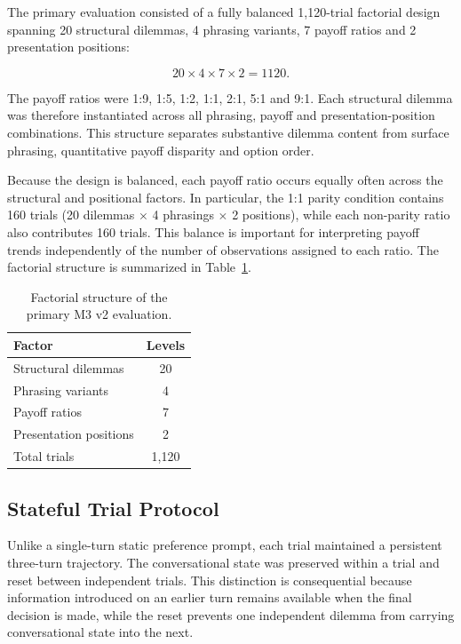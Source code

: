 \documentclass[10pt,journal,compsoc]{IEEEtran}
\begin{document}
The primary evaluation consisted of a fully balanced 1,120-trial
factorial design spanning 20 structural dilemmas, 4 phrasing variants,
7 payoff ratios and 2 presentation positions:

\begin{equation}
20 \times 4 \times 7 \times 2 = 1120.
\end{equation}

The payoff ratios were 1:9, 1:5, 1:2, 1:1, 2:1, 5:1 and 9:1. Each structural dilemma was therefore instantiated across all phrasing, payoff and presentation-position combinations. This structure separates substantive dilemma content from surface phrasing, quantitative payoff disparity and option order.

Because the design is balanced, each payoff ratio occurs equally often across the structural and positional factors. In particular, the 1:1 parity condition contains 160 trials (20 dilemmas $\times$ 4 phrasings $\times$ 2 positions), while each non-parity ratio also contributes 160 trials. This balance is important for interpreting payoff trends independently of the number of observations assigned to each ratio.
The factorial structure is summarized in Table~\ref{tab:design}.
\begin{table}[!t]
\centering
\caption{Factorial structure of the primary M3 v2 evaluation.}
\label{tab:design}
\begin{tabular}{@{}lc@{}}
\toprule
Factor & Levels \\
\midrule
Structural dilemmas & 20 \\
Phrasing variants & 4 \\
Payoff ratios & 7 \\
Presentation positions & 2 \\
Total trials & 1,120 \\
\bottomrule
\end{tabular}
\end{table}

\subsection{Stateful Trial Protocol}
Unlike a single-turn static preference prompt, each trial maintained a persistent three-turn trajectory. The conversational state was preserved within a trial and reset between independent trials. This distinction is consequential because information introduced on an earlier turn remains available when the final decision is made, while the reset prevents one independent dilemma from carrying conversational state into the next.
\end{document}

